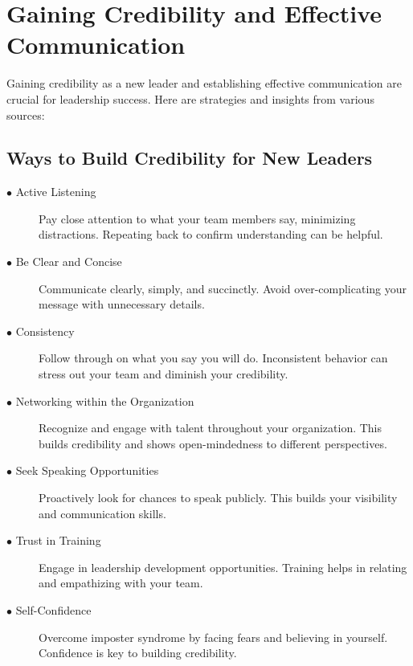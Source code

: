 \documentclass[runningheads]{llncs}
\begin{document}
\section{Gaining Credibility and Effective Communication}


Gaining credibility as a new leader and establishing effective communication are crucial for leadership success. Here are strategies and insights from various sources:

\subsection{Ways to Build Credibility for New Leaders}

\begin{description}

 \item [$\bullet$ Active Listening] Pay close attention to what your team members say, minimizing distractions. Repeating back to confirm understanding can be helpful.\\
 \item [$\bullet$ Be Clear and Concise] Communicate clearly, simply, and succinctly. Avoid over-complicating your message with unnecessary details.\\
 \item [$\bullet$ Consistency] Follow through on what you say you will do. Inconsistent behavior can stress out your team and diminish your credibility.\\
 \item [$\bullet$ Networking within the Organization] Recognize and engage with talent throughout your organization. This builds credibility and shows open-mindedness to different perspectives.\\
 \item [$\bullet$ Seek Speaking Opportunities] Proactively look for chances to speak publicly. This builds your visibility and communication skills.\\
 \item [$\bullet$ Trust in Training] Engage in leadership development opportunities. Training helps in relating and empathizing with your team.\\
 \item [$\bullet$ Self-Confidence] Overcome imposter syndrome by facing fears and believing in yourself. Confidence is key to building credibility.\\

\end{description}
\end{document}
